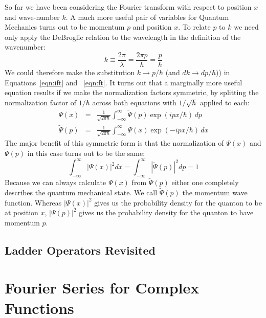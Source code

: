 \documentclass[12pt]{book}
\begin{document}
So far we have been considering the Fourier transform with respect to position $x$ and wave-number $k$.  A much more useful pair of variables for Quantum Mechanics turns out to be momentum $p$ and position $x$.  To relate $p$ to $k$ we need only apply the DeBroglie relation to the wavelength in the definition of the wavenumber:
\begin{displaymath}
k \equiv \frac{2 \pi}{\lambda} = \frac{2 \pi p}{h} = \frac{p}{\hbar}
\end{displaymath}
We could therefore make the substitution $k \to p/\hbar$ (and $dk \to dp / \hbar)$) in Equations~\ref{eqn:ift} and ~\ref{eqn:ft}.  It turns out that a marginally more useful equation results if we make the normalization factors symmetric, by splitting the normalization factor of $1/\hbar$ across both equations with $1/\sqrt{\hbar}$ applied to each:
\begin{eqnarray} 
\Psi(x) &=& \frac{1}{\sqrt{2\pi\hbar}} \int_{-\infty}^{\infty} \widetilde{\Psi}(p) \exp(ipx/\hbar) \, dp \\
\widetilde{\Psi}(p) &=&  \frac{1}{\sqrt{2\pi\hbar}} \int_{-\infty}^{\infty} {\Psi}(x) \exp(-ipx/\hbar) \, dx
\end{eqnarray}
The major benefit of this symmetric form is that the normalization of $\Psi(x)$ and $\widetilde{\Psi}(p)$ in this case turns out to be the same:
\begin{displaymath}
\int_{-\infty}^{\infty} |\Psi(x)|^2 dx = \int_{-\infty}^{\infty} |\widetilde{\Psi}(p)|^2 dp = 1 
\end{displaymath}
Because we can always calculate $\Psi(x)$ from $\widetilde{\Psi}(p)$ either one completely describes the quantum mechanical state.  We call $\widetilde{\Psi}(p)$ the momentum wave function.   Whereas $|\Psi(x)|^2$ gives us the probability density for the quanton to be at position $x$, $|\Psi(p)|^2$ gives us the probability density for the quanton to have momentum $p$.




\section{Ladder Operators Revisited}



\appendix

\chapter{Fourier Series for Complex Functions}
\end{document}
